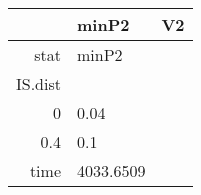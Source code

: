 \begin{table}[ht]
\centering
\begingroup\tiny
\begin{tabular}{rll}
  \hline
 & minP2 & V2 \\ 
  \hline
stat & minP2 &  \\ 
  IS.dist &  &  \\ 
  0 & 0.04 &  \\ 
  0.4 & 0.1 &  \\ 
  time & 4033.6509 &  \\ 
   \hline
\end{tabular}
\endgroup
\end{table}
